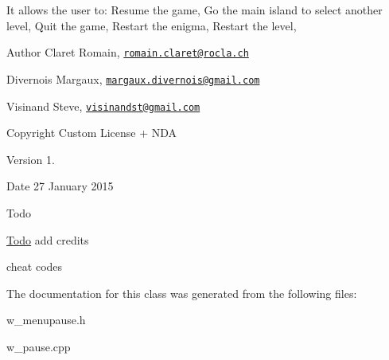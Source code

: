 It allows the user to\+: Resume the game, Go the main island to select another level, Quit the game, Restart the enigma, Restart the level, \begin{DoxyAuthor}{Author}
Claret Romain, \href{mailto:romain.claret@rocla.ch}{\tt romain.\+claret@rocla.\+ch} 

Divernois Margaux, \href{mailto:margaux.divernois@gmail.com}{\tt margaux.\+divernois@gmail.\+com} 

Visinand Steve, \href{mailto:visinandst@gmail.com}{\tt visinandst@gmail.\+com} 
\end{DoxyAuthor}
\begin{DoxyCopyright}{Copyright}
Custom License + N\+D\+A 
\end{DoxyCopyright}
\begin{DoxyVersion}{Version}
1. 
\end{DoxyVersion}
\begin{DoxyDate}{Date}
27 January 2015 
\end{DoxyDate}
\begin{DoxyRefDesc}{Todo}
\item[\hyperlink{todo__todo000012}{Todo}]add credits 

cheat codes \end{DoxyRefDesc}


The documentation for this class was generated from the following files\+:\begin{DoxyCompactItemize}
\item 
w\+\_\+menupause.\+h\item 
w\+\_\+pause.\+cpp\end{DoxyCompactItemize}
